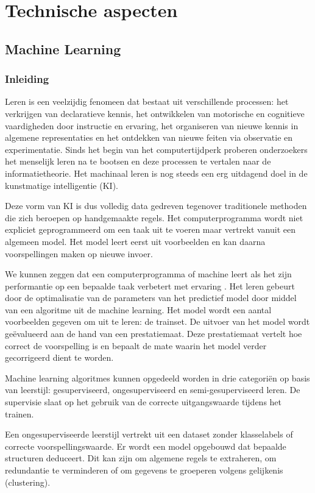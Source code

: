 \chapter{Technische aspecten}
\section{Machine Learning}
\subsection{Inleiding}
\npar Leren is een veelzijdig fenomeen dat bestaat uit  verschillende processen: het verkrijgen van declaratieve kennis, het ontwikkelen van motorische en cognitieve vaardigheden door instructie en ervaring, het organiseren van nieuwe kennis in algemene representaties en het ontdekken van nieuwe feiten via observatie en experimentatie.
\npar Sinds het begin van het computertijdperk proberen onderzoekers het menselijk leren na te bootsen en deze processen te vertalen naar de informatietheorie. Het machinaal leren is nog steeds een erg uitdagend doel in de kunstmatige intelligentie (KI).

\npar Deze vorm van KI is dus volledig data gedreven tegenover traditionele methoden die zich beroepen op handgemaakte regels. Het computerprogramma wordt niet expliciet geprogrammeerd om een taak uit te voeren maar vertrekt vanuit een algemeen model. Het model leert eerst uit voorbeelden en kan daarna voorspellingen maken op nieuwe invoer.

\npar We kunnen zeggen dat een computerprogramma of machine leert als het zijn performantie op een bepaalde taak verbetert met ervaring \cite{machine_overview}.  Het leren gebeurt door de optimalisatie van de parameters van het predictief model door middel van een algoritme uit de machine learning. Het model wordt een aantal voorbeelden gegeven om uit te leren: de trainset. De uitvoer van het model wordt ge\"evalueerd aan de hand van een prestatiemaat. Deze prestatiemaat vertelt hoe correct de voorspelling is en bepaalt de mate waarin het model verder gecorrigeerd dient te worden.

\npar Machine learning algoritmes kunnen opgedeeld worden in drie categori\"en op basis van leerstijl: gesuperviseerd, ongesuperviseerd en semi-gesuperviseerd leren. De supervisie slaat op het gebruik van de correcte uitgangswaarde tijdens het trainen.

\npar Een ongesuperviseerde leerstijl vertrekt uit een dataset zonder klasselabels of correcte voorspellingswaarde. Er wordt een model opgebouwd dat bepaalde structuren deduceert. Dit kan zijn om algemene regels te extraheren, om redundantie te verminderen of om gegevens te groeperen volgens gelijkenis (clustering).

